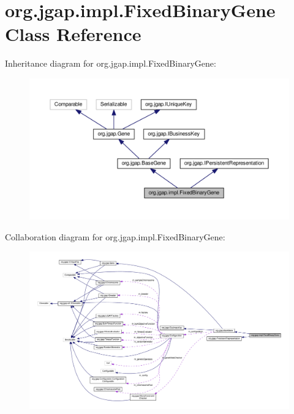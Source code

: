 \hypertarget{classorg_1_1jgap_1_1impl_1_1_fixed_binary_gene}{\section{org.\-jgap.\-impl.\-Fixed\-Binary\-Gene Class Reference}
\label{classorg_1_1jgap_1_1impl_1_1_fixed_binary_gene}
}


Inheritance diagram for org.\-jgap.\-impl.\-Fixed\-Binary\-Gene\-:
\nopagebreak
\begin{figure}[H]
\begin{center}
\leavevmode
\includegraphics[width=350pt]{classorg_1_1jgap_1_1impl_1_1_fixed_binary_gene__inherit__graph}
\end{center}
\end{figure}


Collaboration diagram for org.\-jgap.\-impl.\-Fixed\-Binary\-Gene\-:
\nopagebreak
\begin{figure}[H]
\begin{center}
\leavevmode
\includegraphics[width=350pt]{classorg_1_1jgap_1_1impl_1_1_fixed_binary_gene__coll__graph}
\end{center}
\end{figure}
